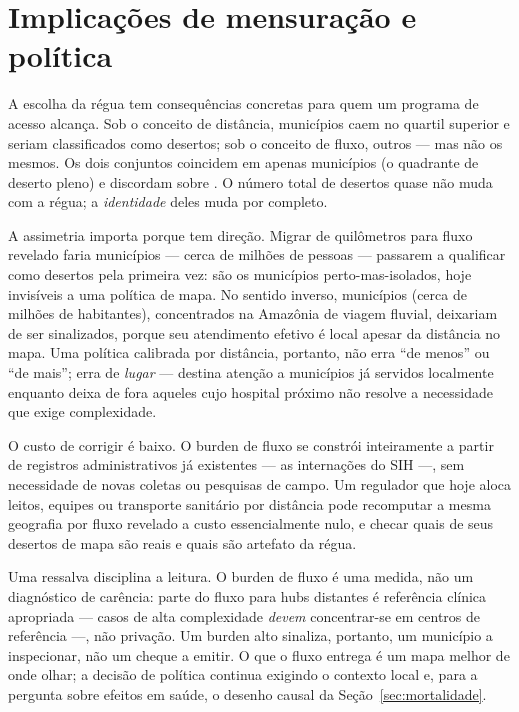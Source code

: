 
\section{Implicações de mensuração e política}
\label{sec:implicacoes}

A escolha da régua tem consequências concretas para quem um programa de acesso
alcança. Sob o conceito de distância, \valNdesertEach{} municípios caem no
quartil superior e seriam classificados como desertos; sob o conceito de fluxo,
outros \valNdesertEach{} --- mas não os mesmos. Os dois conjuntos coincidem em
apenas \valNbothOnly{} municípios (o quadrante de deserto pleno) e discordam
sobre \valNdisagreeMun.%
O número total de desertos quase não muda com a régua; a \emph{identidade} deles
muda por completo.

A assimetria importa porque tem direção. Migrar de quilômetros para fluxo
revelado faria \valFOn{} municípios --- cerca de \valFOpop{} milhões de pessoas
--- passarem a qualificar como desertos pela primeira vez: são os municípios
perto-mas-isolados, hoje invisíveis a uma política de mapa. No sentido inverso,
\valDOn{} municípios (cerca de \valDOpop{} milhões de habitantes), concentrados
na Amazônia de viagem
fluvial, deixariam de ser sinalizados, porque seu atendimento efetivo é local
apesar da distância no mapa. Uma política calibrada por distância, portanto, não
erra ``de menos'' ou ``de mais''; erra de \emph{lugar} --- destina atenção a
municípios já servidos localmente enquanto deixa de fora aqueles cujo hospital
próximo não resolve a necessidade que exige complexidade.

O custo de corrigir é baixo. O burden de fluxo se constrói inteiramente a partir
de registros administrativos já existentes --- as internações do SIH ---, sem
necessidade de novas coletas ou pesquisas de campo. Um regulador que hoje aloca
leitos, equipes ou transporte sanitário por distância pode recomputar a mesma
geografia por fluxo revelado a custo essencialmente nulo, e checar quais de seus
desertos de mapa são reais e quais são artefato da régua.

Uma ressalva disciplina a leitura. O burden de fluxo é uma medida, não um
diagnóstico de carência: parte do fluxo para hubs distantes é referência
clínica apropriada --- casos de alta complexidade \emph{devem} concentrar-se em
centros de referência ---, não privação. Um burden alto sinaliza, portanto, um
município a inspecionar, não um cheque a emitir. O que o fluxo entrega é um mapa
melhor de onde olhar; a decisão de política continua exigindo o contexto local
e, para a pergunta sobre efeitos em saúde, o desenho causal da
Seção~\ref{sec:mortalidade}.
